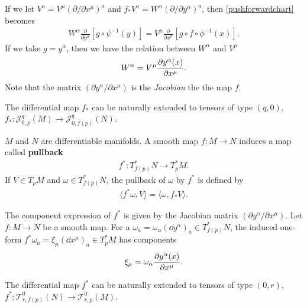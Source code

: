 \documentclass[10pt]{article}
\begin{document}
If we let $V^a=V^\mu(\partial/\partial x^\mu)^a$ and $f_*V^a=W^\alpha(\partial/\partial y^\alpha)^a$, then \cref{pushforwardchart} becomes
\begin{align}
    W^\alpha\frac{\partial}{\partial y^\alpha}\left[g\circ\psi^{-1}(y)\right]=V^\mu\frac{\partial}{\partial x^\mu}\left[g\circ f\circ\phi^{-1}(x)\right].
\end{align}
If we take $g=y^\alpha$, then we have the relation between $W^\alpha$ and $V^\mu$
\begin{align}
    W^\alpha=V^\mu\pdv{y^\alpha(x)}{x^\mu}.
\end{align}
Note that the matrix $(\partial y^\alpha/\partial x^\mu)$ is the \textit{Jacobian} the the map $f$.

\begin{remark}
    The differential map $f_*$ can be naturally extended to tensors of type $(q,0)$, $f_*:\mathcal{J}^{q}_{0,p}(M)\to\mathcal{J}^q_{0,f(p)}(N)$.
\end{remark}

\begin{definition}[Pullback]
    $M$ and $N$ are differentiable manifolds.
    A smooth map $f:M\to N$ induces a map called \textbf{pullback}
    \begin{align}
        f^*:T^*_{f(p)}N\to T^*_p M.
    \end{align}
    If $V\in T_p M$ and $\omega\in T^*_{f(p)}N$, the pullback of $\omega$ by $f^*$ is defined by
    \begin{align}
        \langle f^*\omega,V\rangle=\langle\omega,f_* V\rangle.
    \end{align}
\end{definition}
The component expression of $f^*$ is given by the Jacobian matrix $\left(\partial y^\alpha/\partial x^\mu\right)$.
Let $f:M\to N$ be a smooth map.
For a $\omega_a=\omega_\alpha(\dd{y^\alpha})_a\in T^*_{f(p)}N$, the induced one-form $f^*\omega_a=\xi_\mu(\dd{x^\mu})_a\in T^*_p M$ has components
\begin{align}
    \xi_\mu=\omega_\alpha\pdv{y^\alpha(x)}{x^\mu}.
\end{align}
\begin{remark}
    The differential map $f^*$ can be naturally extended to tensors of type $(0,r)$, $f^*:\mathcal{T}^{0}_{r,f(p)}(N)\to\mathcal{T}^0_{r,p}(M)$.
\end{remark}
\end{document}
